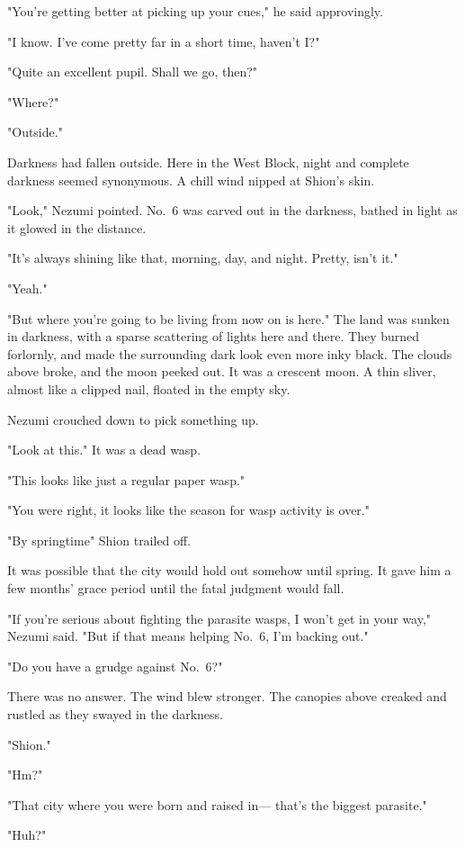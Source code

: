 "You're getting better at picking up your cues," he said approvingly.

"I know. I've come pretty far in a short time, haven't I?"

"Quite an excellent pupil. Shall we go, then?"

"Where?"

"Outside."

Darkness had fallen outside. Here in the West Block, night and complete
darkness seemed synonymous. A chill wind nipped at Shion's skin.

"Look," Nezumi pointed. No.~6 was carved out in the darkness, bathed in
light as it glowed in the distance.

"It's always shining like that, morning, day, and night. Pretty, isn't
it."

"Yeah."

"But where you're going to be living from now on is here." The land was
sunken in darkness, with a sparse scattering of lights here and there.
They burned forlornly, and made the surrounding dark look even more inky
black. The clouds above broke, and the moon peeked out. It was a
crescent moon. A thin sliver, almost like a clipped nail, floated in the
empty sky.

Nezumi crouched down to pick something up.

"Look at this." It was a dead wasp.

"This looks like just a regular paper wasp."

"You were right, it looks like the season for wasp activity is over."

"By springtime\el " Shion trailed off.

It was possible that the city would hold out somehow until spring. It
gave him a few months' grace period until the fatal judgment would fall.

"If you're serious about fighting the parasite wasps, I won't get in
your way," Nezumi said. "But if that means helping No.~6, I'm backing
out."

"Do you have a grudge against No.~6?"

There was no answer. The wind blew stronger. The canopies above creaked
and rustled as they swayed in the darkness.

"Shion."

"Hm?"

"That city where you were born and raised in--- that's the biggest
parasite."

"Huh?"

